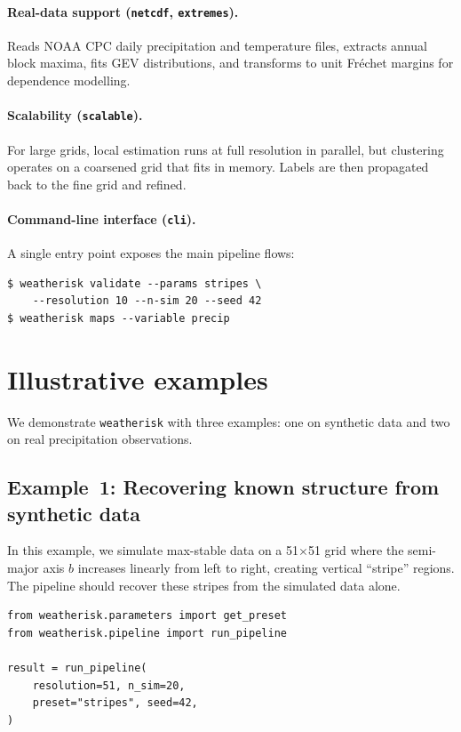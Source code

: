 \documentclass[preprint,12pt,a4paper]{elsarticle}
\begin{document}
\paragraph{Real-data support (\texttt{netcdf}, \texttt{extremes}).}
Reads NOAA CPC daily precipitation and temperature files,
extracts annual block maxima, fits GEV distributions, and
transforms to unit Fr\'{e}chet margins for dependence modelling.

\paragraph{Scalability (\texttt{scalable}).}
For large grids, local estimation runs at full resolution in
parallel, but clustering operates on a coarsened grid that fits
in memory.  Labels are then propagated back to the fine grid
and refined.

\paragraph{Command-line interface (\texttt{cli}).}
A single entry point exposes the main pipeline flows:
\begin{lstlisting}[numbers=none]
$ weatherisk validate --params stripes \
    --resolution 10 --n-sim 20 --seed 42
$ weatherisk maps --variable precip
\end{lstlisting}

\section{Illustrative examples}
\label{sec:examples}

We demonstrate \texttt{weatherisk} with three examples: one on
synthetic data and two on real precipitation observations.

\subsection{Example~1: Recovering known structure from
  synthetic data}
\label{sec:ex-synthetic}

In this example, we simulate max-stable data on a 51$\times$51 grid
where the semi-major axis $b$ increases linearly from left to right,
creating vertical ``stripe'' regions.  The pipeline should recover
these stripes from the simulated data alone.

\begin{lstlisting}[caption={Running the stripes validation.},
  label=lst:validate]
from weatherisk.parameters import get_preset
from weatherisk.pipeline import run_pipeline

result = run_pipeline(
    resolution=51, n_sim=20,
    preset="stripes", seed=42,
)
\end{lstlisting}
\end{document}
